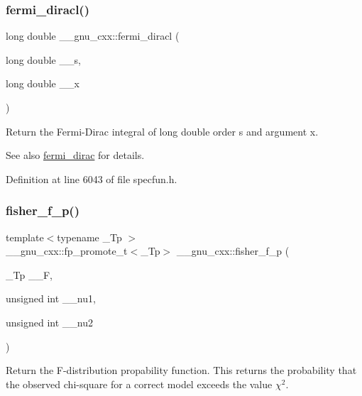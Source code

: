\subsubsection{\texorpdfstring{fermi\+\_\+diracl()}{fermi\_diracl()}}
{\footnotesize\ttfamily long double \+\_\+\+\_\+gnu\+\_\+cxx\+::fermi\+\_\+diracl (\begin{DoxyParamCaption}\item[{long double}]{\+\_\+\+\_\+s,  }\item[{long double}]{\+\_\+\+\_\+x }\end{DoxyParamCaption})\hspace{0.3cm}{\ttfamily [inline]}}

Return the Fermi-\/\+Dirac integral of {\ttfamily  long double } order s and argument x.

\begin{DoxySeeAlso}{See also}
\hyperlink{group__gnu__math__spec__func_ga5468fbaed5cb8384cff7cfb9d2188d1a}{fermi\+\_\+dirac} for details. 
\end{DoxySeeAlso}


Definition at line 6043 of file specfun.\+h.

\mbox{\label{group__gnu__math__spec__func_ga1c769cbf42c1abecc6881cfe67dc6d14}} 
\subsubsection{\texorpdfstring{fisher\+\_\+f\+\_\+p()}{fisher\_f\_p()}}
{\footnotesize\ttfamily template$<$typename \+\_\+\+Tp $>$ \\
\+\_\+\+\_\+gnu\+\_\+cxx\+::fp\+\_\+promote\+\_\+t$<$\+\_\+\+Tp$>$ \+\_\+\+\_\+gnu\+\_\+cxx\+::fisher\+\_\+f\+\_\+p (\begin{DoxyParamCaption}\item[{\+\_\+\+Tp}]{\+\_\+\+\_\+F,  }\item[{unsigned int}]{\+\_\+\+\_\+nu1,  }\item[{unsigned int}]{\+\_\+\+\_\+nu2 }\end{DoxyParamCaption})}



Return the F-\/distribution propability function. This returns the probability that the observed chi-\/square for a correct model exceeds the value $ \chi^2 $. 

